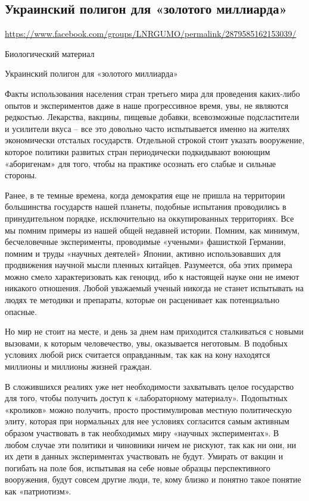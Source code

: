  
 

\subsection{Украинский полигон для «золотого миллиарда»}
\url{https://www.facebook.com/groups/LNRGUMO/permalink/2879585162153039/}


Биологический материал

Украинский полигон для «золотого миллиарда»

Факты использования населения стран третьего мира для проведения каких-либо
опытов и экспериментов даже в наше прогрессивное время, увы, не являются
редкостью. Лекарства, вакцины, пищевые добавки, всевозможные подсластители и
усилители вкуса – все это довольно часто испытывается именно на жителях
экономически отсталых государств. Отдельной строкой стоит указать вооружение,
которое политики развитых стран периодически подкидывают воюющим «аборигенам»
для того, чтобы на практике осознать его слабые и сильные стороны.

Ранее, в те темные времена, когда демократия еще не пришла на территории
большинства государств нашей планеты, подобные испытания проводились в
принудительном порядке, исключительно на оккупированных территориях. Все мы
помним примеры из нашей общей недавней истории. Помним, как минимум,
бесчеловечные эксперименты, проводимые «учеными» фашисткой Германии, помним и
труды «научных деятелей» Японии, активно использовавших для продвижения научной
мысли пленных китайцев. Разумеется, оба этих примера можно смело
характеризовать как геноцид, ибо к настоящей науке они не имеют никакого
отношения. Любой уважаемый ученый никогда не станет испытывать на людях те
методики и препараты, которые он расценивает как потенциально опасные.

Но мир не стоит на месте, и день за днем нам приходится сталкиваться с новыми
вызовами, к которым человечество, увы, оказывается неготовым. В подобных
условиях любой риск считается оправданным, так как на кону находятся миллионы и
миллионы жизней граждан.

В сложившихся реалиях уже нет необходимости захватывать целое государство для
того, чтобы получить доступ к «лабораторному материалу». Подопытных «кроликов»
можно получить, просто простимулировав местную политическую элиту, которая при
нормальных для нее условиях согласится самым активным образом участвовать в так
необходимых миру «научных экспериментах». В любом случае эти политики и
чиновники ничем не рискуют, так как ни они, ни их дети в данных экспериментах
участвовать не будут. Умирать от вакцин и погибать на поле боя, испытывая на
себе новые образцы перспективного вооружения, будут совсем другие люди, те,
кому близко и понятно такое понятие как «патриотизм».

